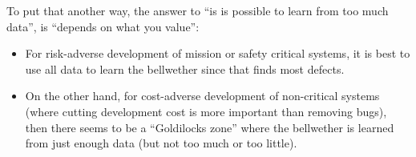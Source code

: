 \documentclass[10pt,journal,compsoc]{IEEEtran}
\newcommand{\bi}{\begin{itemize}}
\newcommand{\ei}{\end{itemize}}
\begin{document}
To put that another way, the answer to ``is is possible to learn from too much data'', is ``depends on what you value'':
\bi
\item
For risk-adverse development of mission or safety critical
systems, it is best to use all data to learn the bellwether
since that finds most defects.
\item
On the other hand, for cost-adverse development of non-critical
systems (where cutting development cost
is more important than removing
bugs), then there seems to be a ``Goldilocks zone'' where
the bellwether is learned from just enough data (but not too much or too little).
\ei


\end{document}
